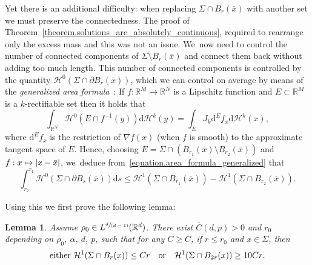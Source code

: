 \documentclass[JEP,XML,SOM,Unicode,NoFloatCountersInSection,published]{cedram}
\newcommand\mto{\mathchoice{\longmapsto}{\mapsto}{\mapsto}{\mapsto}}
\newcommand{\spfrac}[2]{\sfrac{#1}{(#2)}}
\newtheorem{lemma}[theorem]{Lemma}
\theoremstyle{definition}
\newcommand\cH{\mathcal{H}}
\newcommand{\RR}{\mathbb{R}}
\newcommand\dd{\mathrm{d}}
\begin{document}
Yet there is an additional difficulty: when replacing $\Sigma \cap B_r(\bar x)$ with
another set we must preserve the connectedness.
The proof of Theorem~\ref{theorem.solutions_are_absolutely_continuous}, required to rearrange only the excess mass
and this was not an issue. We~now need to control the number of connected components
of $\Sigma \setminus B_r(\bar x)$ and connect them back without adding
too much length.
This number of connected components is controlled by the
quantity \hbox{$\cH^0(\Sigma\cap\partial B_r(\bar x))$}, which we can control on average
by means of the \emph{generalized area formula}~\cite[Th.\,2.91]{ambrosio2000functions}: If $f:\RR^M \to \RR^N$ is a Lipschitz function and $E\subset \RR^M$ is a $k$-rectifiable set then it holds that
\begin{equation}
\label{equation.area_formula_generalized}
\int_{\RR^N} \cH^0(E \cap f^{-1}(y))\dd\cH^k(y)
=
\int_{E} J_k\dd^Ef_x \dd\cH^k(x),
\end{equation}
where $\dd^Ef_x$ is the restriction of $\nabla f(x)$ (when $f$ is smooth) to the approximate tangent space of $E$.
Hence, choosing $E = \Sigma \cap (B_{r_1}(\bar x) \setminus B_{r_2}(\bar x))$ and $f : x \mto |x - \bar x|$, we~deduce from~\eqref{equation.area_formula_generalized} that
\begin{equation}\label{equation.area_formula_generalized_inequality}
\int_{r_2}^{r_1} \cH^0(\Sigma \cap \partial B_s(\bar x))\dd s
\le
\cH^1(\Sigma \cap B_{r_1}(\bar x)) - \cH^1(\Sigma \cap B_{r_2}(\bar x)).
\end{equation}

Using this we first prove the following lemma:
\begin{lemma}\label{lemma.ahlfors}
Assume $\rho_0\in L^{\spfrac{d}{d-1}}(\RR^d)$.
There exist $\bar C(d,p)>0$ and $r_0$ depending on $\rho_0$, $\alpha$, $d$, $p$, such
that for any $C\ge \bar C$, if $r\le r_0$ and $x\in \Sigma$,
then
\[
\text{either $\cH^1(\Sigma\cap B_r(x))\le Cr$\quad or\quad $\cH^1(\Sigma\cap B_{2r}(x))\ge 10Cr$.}
\]

\end{lemma}
\end{document}
